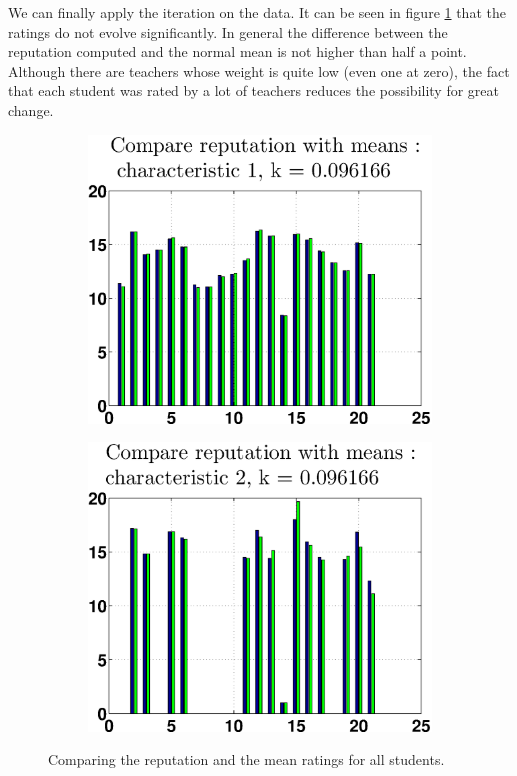 \documentclass[12pt,a4paper]{article}
\begin{document}
We can finally apply the iteration on the data. It can be seen in figure \ref{compRM} that the ratings do not evolve significantly. In general the difference between the reputation computed and the normal mean is not higher than half a point.\\
Although there are teachers whose weight is quite low (even one at zero), the fact that each student was rated by a lot of teachers reduces the possibility for great change.

\begin{figure}[!h]
\centering
\begin{subfigure}[b]{0.49\textwidth}
\centering
\includegraphics[width = \textwidth]{preprocessSelect/ppscompareRepc1K3fb89e54e9211a25.eps}
\end{subfigure}
\begin{subfigure}[b]{0.49\textwidth}
\centering
\includegraphics[width = \textwidth]{preprocessSelect/ppscompareRepc2K3fb89e54e9211a25.eps}
\end{subfigure}
\caption{\label{compRM}Comparing the reputation and the mean ratings for all students.}
\end{figure}
\end{document}
